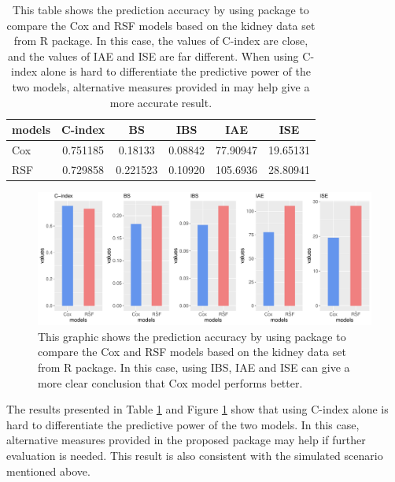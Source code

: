 \begin{table}[h]
  \centering
  \begin{tabular}{lccccc}
  \hline
  models & C-index  & BS       & IBS      & IAE      & ISE      \\
  \hline
  Cox    & 0.751185 & 0.18133  & 0.08842 & 77.90947 & 19.65131 \\
  RSF    & 0.729858 & 0.221523 & 0.10920 & 105.6936 & 28.80941\\
  \hline
  \end{tabular}
  \caption{
    This table shows the prediction accuracy by using  package to compare the Cox and RSF models based on the kidney data set from  R package. In this case, the values of C-index are close, and the values of IAE and ISE are far different. When using C-index alone is hard to differentiate the predictive power of the two models, alternative measures provided in  may help give a more accurate result.}\label{tab3.2}
\end{table}

\begin{figure}[h]
  \centering
  \begin{center}
  \includegraphics[width=\textwidth]{kidneyres.pdf}
  \caption{
    This graphic shows the prediction accuracy by using  package to compare the Cox and RSF models based on the kidney data set from  R package. In this case, using IBS, IAE and ISE can give a more clear conclusion that Cox model performs better.}\label{fig3.2}
  \end{center}
\end{figure}

The results presented in Table \ref{tab3.2} and Figure \ref{fig3.2} show that using C-index alone is hard to differentiate the predictive power of the two models. In this case, alternative measures provided in the proposed package may help if further evaluation is needed. This result is also  consistent with the simulated scenario mentioned above.

